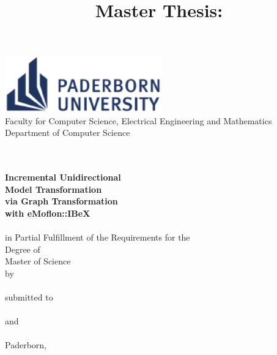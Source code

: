 \documentclass[a4paper,
	DIV=12,
	BCOR=1cm,
	twoside,
	toc=listofnumbered,
	bibliography=totocnumbered,
	numbers=noenddot,
	abstract=on
	]{scrreprt}
\title{Master Thesis: \Title}
\author{\Author}
\date{\DateOfThesisSubmission}
\newtheorem[style=M, bodystyle={\noindent}]{theorem}{Theorem}
\newtheorem[style=M, bodystyle={\noindent}]{definition}[theorem]{Definition}
\begin{document}
	\addtolength{\oddsidemargin}{0.75cm}
	\begin{titlepage}
		\begin{center}
			\begin{minipage}{13.5cm}		
				\includegraphics[height = 2.4cm]{../common/figures/university-logo-en} \\[3pt]
				\textsf{
					\hspace*{2.2cm} Faculty for Computer Science, Electrical Engineering and Mathematics \\
					\hspace*{2.2cm} Department of Computer Science \\
					\hspace*{2.2cm} \ResearchGroup \\
					\hspace*{2.2cm} \Address
				}
			\end{minipage}\\[60pt]

			{\Huge\bfseries
				Incremental Unidirectional \\
				Model Transformation \\
				via Graph Transformation \\[5pt]
				with eMoflon::IBeX} \\[30pt]

			{\LARGE \ThesisType} \\[15pt]
			in Partial Fulfillment of the Requirements for the\\
			Degree of \\[15pt]
			{\Large Master of Science} \\[30pt]

			by \\[5pt]

			{\scshape\large \Author} \\[30pt]

			submitted to \\[5pt]

			{\scshape\large \Supervisor} \\[5pt]

			and \\[5pt]

			{\scshape\large \SecondExaminer} \\[40pt]

			{Paderborn, \DateOfThesisSubmission}
		\end{center}
	\end{titlepage}
	\addtolength{\oddsidemargin}{-0.75cm}
\end{document}
